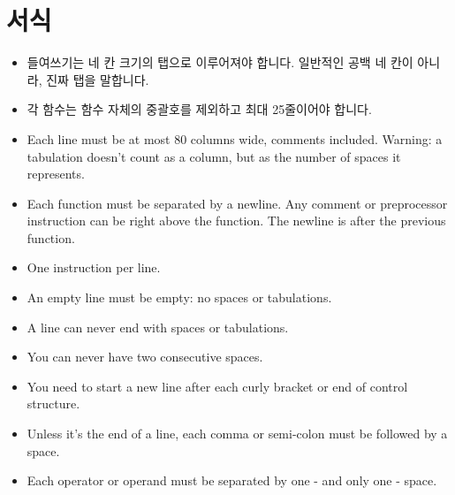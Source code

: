 \documentclass{42-ko}
\begin{document}
    \section{서식}

            \begin{itemize}

                \item 들여쓰기는 네 칸 크기의 탭으로 이루어져야 합니다.
                    일반적인 공백 네 칸이 아니라, 진짜 탭을 말합니다.

                \item 각 함수는 함수 자체의 중괄호를 제외하고 
                    최대 25줄이어야 합니다.

                \item Each line must be at most 80 columns wide, comments
                  included. Warning: a tabulation doesn't count
                  as a column, but as the number of spaces it
                  represents.

                \item Each function must be separated by a newline. Any comment or preprocessor instruction
                    can be right above the function. The newline is after the previous function.

                \item One instruction per line.

                \item An empty line must be empty: no spaces or tabulations.

                \item A line can never end with spaces or tabulations.

                \item You can never have two consecutive spaces.

                \item You need to start a new line after each curly bracket
                  or end of control structure.

                \item Unless it's the end of a line, each comma or semi-colon
                  must be followed by a space.

                \item Each operator or operand must be separated by one
                 - and only one - space.


\end{itemize}
\end{document}
